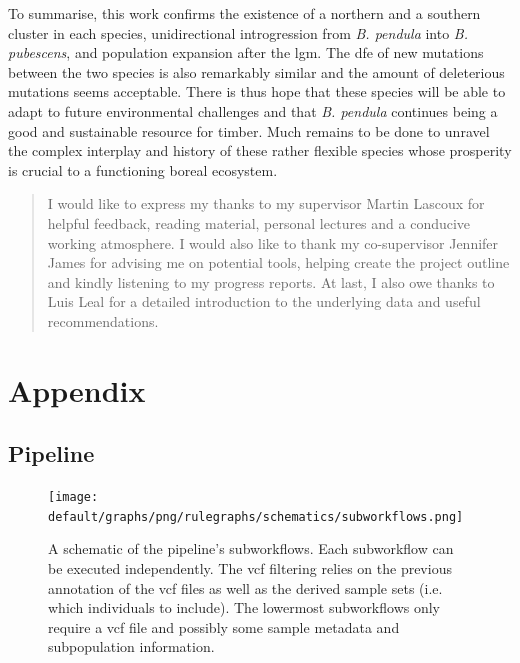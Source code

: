 \documentclass[hidelinks,11pt]{article}
\newcommand{\pendula}{\textit{B. pendula}}
\newcommand{\pubescens}{\textit{B. pubescens}}
\newenvironment{acknowledgements}{
    \renewcommand{\abstractname}{Acknowledgements}
    \begin{abstract}
    }{\end{abstract}}
\begin{document}
    To summarise, this work confirms the existence of a northern and a southern cluster in each species, unidirectional introgression from \pendula{} into \pubescens{}, and population expansion after the \acrshort{lgm}. The \acrshort{dfe} of new mutations between the two species is also remarkably similar and the amount of deleterious mutations seems acceptable. There is thus hope that these species will be able to adapt to future environmental challenges and that \pendula{} continues being a good and sustainable resource for timber. Much remains to be done to unravel the complex interplay and history of these rather flexible species whose prosperity is crucial to a functioning boreal ecosystem.

    \clearpage
    
    \begin{acknowledgements}
        I would like to express my thanks to my supervisor Martin Lascoux for helpful feedback, reading material, personal lectures and a conducive working atmosphere. I would also like to thank my co-supervisor Jennifer James for advising me on potential tools, helping create the project outline and kindly listening to my progress reports. At last, I also owe thanks to Luis Leal for a detailed introduction to the underlying data and useful recommendations.
    \end{acknowledgements}

    \clearpage

    

    \clearpage

	\appendix
	\setcounter{figure}{0}
	\renewcommand{\thefigure}{A\arabic{figure}}

    \section{Appendix}
    \label{sec:appendix}

    \subsection{Pipeline}
    \label{sec:appendix-pipeline}
    
    \begin{figure}[ht]
        \centering
        \texttt{[image: default/graphs/png/rulegraphs/schematics/subworkflows.png]}
        \caption{A schematic of the pipeline's subworkflows. Each subworkflow can be executed independently. The \acrshort{vcf} filtering relies on the previous annotation of the \acrshort{vcf} files as well as the derived sample sets (i.e. which individuals to include). The lowermost subworkflows only require a \acrshort{vcf} file and possibly some sample metadata and subpopulation information.}
        \label{fig:subworkflows}
    \end{figure}
\end{document}
